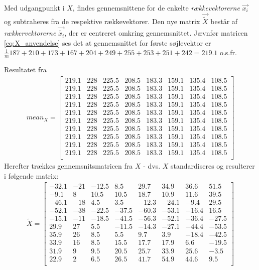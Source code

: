 Med udgangpunkt i $X$, findes gennemsnittene for de enkelte \emph{rækkevektorerne} $\vec{x_i}$ og subtraheres fra de respektive rækkevektorer. Den nye matrix $\vec{\tilde{X}}$ består af \emph{rækkervektorerne} $\vec{\tilde{x_i}}$, der er centreret omkring gennemsnittet. Jævnfør matricen \vref{eq:X_anvendelse} ses det at gennemsnittet for første søjlevektor  er $\frac{1}{m}187+210+173+167+204+249+255+253+251+242 = 219.1$ o.s.fr.

Resultatet fra 
\begin{align}
mean_X = \begin{bmatrix}
219.1 & 228 & 225.5 & 208.5 & 183.3 & 159.1 & 135.4 & 108.5 \\
219.1 & 228 & 225.5 & 208.5 & 183.3 & 159.1 & 135.4 & 108.5 \\
219.1 & 228 & 225.5 & 208.5 & 183.3 & 159.1 & 135.4 & 108.5 \\
219.1 & 228 & 225.5 & 208.5 & 183.3 & 159.1 & 135.4 & 108.5 \\
219.1 & 228 & 225.5 & 208.5 & 183.3 & 159.1 & 135.4 & 108.5 \\
219.1 & 228 & 225.5 & 208.5 & 183.3 & 159.1 & 135.4 & 108.5 \\
219.1 & 228 & 225.5 & 208.5 & 183.3 & 159.1 & 135.4 & 108.5 \\
219.1 & 228 & 225.5 & 208.5 & 183.3 & 159.1 & 135.4 & 108.5 \\
219.1 & 228 & 225.5 & 208.5 & 183.3 & 159.1 & 135.4 & 108.5 \\
219.1 & 228 & 225.5 & 208.5 & 183.3 & 159.1 & 135.4 & 108.5 \\
\end{bmatrix}
\label{eq:X_anvendelse}
\end{align}
Herefter trækkes gennemsnitsmatricen fra $X$ - dvs. $X$ standardiseres og resulterer i følgende matrix: 
\begin{align}
\tilde{X}=\begin{bmatrix}
-32.1 & -21 & -12.5 & 8.5 & 29.7 & 34.9 & 36.6 & 51.5 \\
-9.1 & 8 & 10.5 & 10.5 & 18.7 & 10.9 & 11.6 & 39.5 \\
-46.1 & -18 & 4.5 & 3.5 & -12.3 & -24.1 & -9.4 & 29.5 \\
-52.1 & -38 & -22.5 & -37.5 & -60.3 & -53.1 & -16.4 & 16.5 \\
-15.1 & -11 & -18.5 & -41.5 & -56.3 & -52.1 & -36.4 & -27.5 \\
29.9 & 27 & 5.5 &  -11.5 & -14.3 & -27.1 & -44.4 & -53.5 \\
35.9 & 26 & 8.5 & 5.5 & 9.7 & 3.9 & -18.4 & -42.5 \\
33.9 & 16 & 8.5 & 15.5 & 17.7 & 17.9 & 6.6 & -19.5 \\
31.9 & 9 & 9.5 & 20.5 & 25.7 & 33.9 & 25.6 & -3.5 \\
22.9 & 2 & 6.5 & 26.5 & 41.7 & 54.9 & 44.6 & 9.5 \\
\end{bmatrix}
\label{eq:X_tilde}
\end{align}
